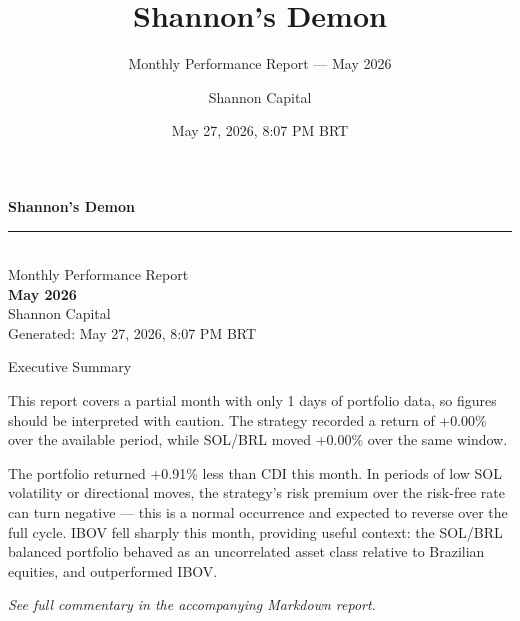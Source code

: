 \documentclass[aspectratio=169,10pt]{beamer}
\title{Shannon's Demon}
\subtitle{Monthly Performance Report --- May 2026}
\author{Shannon Capital}
\date{May 27, 2026, 8:07 PM BRT}
\institute{}
\begin{document}
\begin{frame}[plain]
\vspace{2.0cm}
\begin{center}
  {\color{white}\fontsize{26}{32}\selectfont\bfseries Shannon's Demon}\\[0.4cm]
  {\color{Gold}\rule{7cm}{0.6pt}}\\[0.35cm]
  {\color{white!70!black}\normalsize\mdseries Monthly Performance Report}\\[0.15cm]
  {\color{Gold}\large\bfseries May 2026}\\[1.0cm]
  {\color{white!50!black}\small Shannon Capital}\\[0.1cm]
  {\color{white!35!black}\scriptsize Generated: May 27, 2026, 8:07 PM BRT}
\end{center}
\end{frame}

\begin{frame}{Executive Summary}
\vspace{0.4em}
{\small\color{BodyText}
This report covers a partial month with only 1 days of portfolio data, so figures should be interpreted with caution. The strategy recorded a return of +0.00\% over the available period, while SOL/BRL moved +0.00\% over the same window.

The portfolio returned +0.91\% less than CDI this month. In periods of low SOL volatility or directional moves, the strategy's risk premium over the risk-free rate can turn negative — this is a normal occurrence and expected to reverse over the full cycle. IBOV fell sharply this month, providing useful context: the SOL/BRL balanced portfolio behaved as an uncorrelated asset class relative to Brazilian equities, and outperformed IBOV.
}
\vspace{0.4em}
{\scriptsize\color{MutedText}\textit{See full commentary in the accompanying Markdown report.}}
\end{frame}
\end{document}
